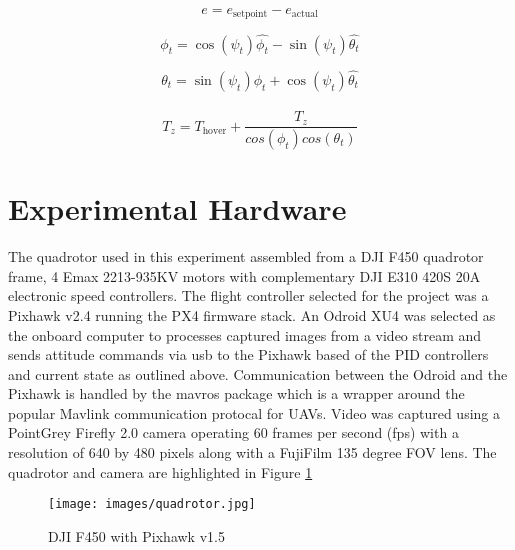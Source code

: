 \documentclass[11pt, twocolumn]{article}
\begin{document}
\begin{equation}
	\label{eq:pid_error}
	e = e_{\text{setpoint}} - e_{\text{actual}}
\end{equation}

\begin{equation}
	\label{eq:pid_roll_adjusted}
	\phi_t = \cos(\psi_t) \hat{\phi_t} - \sin(\psi_t) \hat{\theta_t}
\end{equation}

\begin{equation}
	\label{eq:pid_pitch_adjusted}
	\theta_t = \sin(\psi_t) \hat{\phi_t} + \cos(\psi_t) \hat{\theta_t}
\end{equation}

\begin{equation}
	\label{eq:pid_thrust_adjusted}
	T_{z} = 
		T_{\text{hover}} +
		\frac{\hat{T_{z}}}{cos(\phi_t) cos(\theta_t)}
\end{equation}


\section{Experimental Hardware}
The quadrotor used in this experiment assembled from a DJI F450 quadrotor frame, 4 Emax 2213-935KV motors with complementary DJI E310 420S 20A electronic speed controllers. The flight controller selected for the project was a Pixhawk v2.4 running the PX4 firmware stack. An Odroid XU4 was selected as the onboard computer to processes captured images from a video stream and sends attitude commands via usb to the Pixhawk based of the PID controllers and current state as outlined above. Communication between the Odroid and the Pixhawk is handled by the mavros package which is a wrapper around the popular Mavlink communication protocal for UAVs.  Video was captured using a PointGrey Firefly 2.0 camera operating 60 frames per second (fps) with a resolution of 640 by 480 pixels along with a FujiFilm 135 degree FOV lens. The quadrotor and camera are highlighted in Figure \ref{Quadrotor}

\begin{figure}[H]
	\centering
	\texttt{[image: images/quadrotor.jpg]}
	\caption{DJI F450 with Pixhawk v1.5}
	\label{Quadrotor}
\end{figure}
\end{document}
